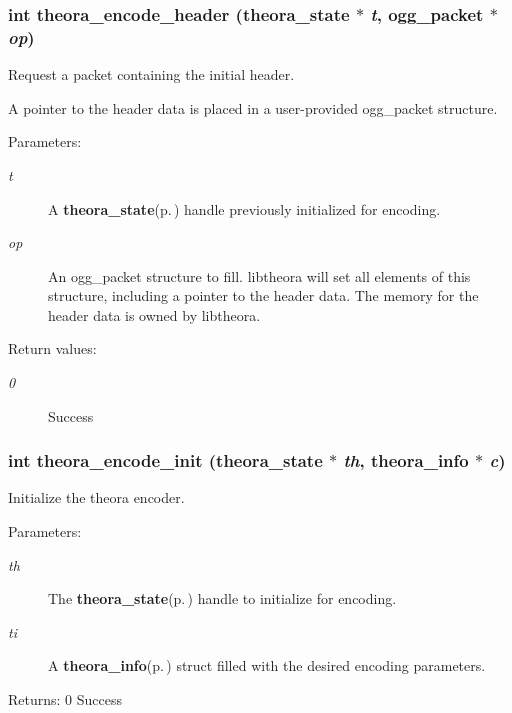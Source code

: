 \subsubsection{\setlength{\rightskip}{0pt plus 5cm}int theora\_\-encode\_\-header ({\bf theora\_\-state} $\ast$ {\em t}, ogg\_\-packet $\ast$ {\em op})}\label{theora_8h_a18}


Request a packet containing the initial header. 

A pointer to the header data is placed in a user-provided ogg\_\-packet structure. \begin{Desc}
\item[Parameters:]
\begin{description}
\item[{\em t}]A {\bf theora\_\-state}{\rm (p.\,\pageref{structtheora__state})} handle previously initialized for encoding. \item[{\em op}]An ogg\_\-packet structure to fill. libtheora will set all elements of this structure, including a pointer to the header data. The memory for the header data is owned by libtheora. \end{description}
\end{Desc}
\begin{Desc}
\item[Return values:]
\begin{description}
\item[{\em 0}]Success \end{description}
\end{Desc}
\subsubsection{\setlength{\rightskip}{0pt plus 5cm}int theora\_\-encode\_\-init ({\bf theora\_\-state} $\ast$ {\em th}, {\bf theora\_\-info} $\ast$ {\em c})}\label{theora_8h_a15}


Initialize the theora encoder. 

\begin{Desc}
\item[Parameters:]
\begin{description}
\item[{\em th}]The {\bf theora\_\-state}{\rm (p.\,\pageref{structtheora__state})} handle to initialize for encoding. \item[{\em ti}]A {\bf theora\_\-info}{\rm (p.\,\pageref{structtheora__info})} struct filled with the desired encoding parameters. \end{description}
\end{Desc}
\begin{Desc}
\item[Returns:]0 Success \end{Desc}
